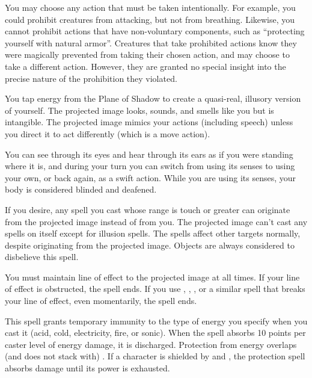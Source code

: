 You may choose any action that must be taken intentionally. For example, you could prohibit creatures from attacking, but not from breathing. Likewise, you cannot prohibit actions that have non-voluntary components, such as ``protecting yourself with natural armor''. 
\spellnotes Creatures that take prohibited actions know they were magically prevented from taking their chosen action, and may choose to take a different action. However, they are granted no special insight into the precise nature of the prohibition they violated.

\spellrng{\rngmed}
\spelldur{\durshort \dismissable}
\spelleffect You tap energy from the Plane of Shadow to create a quasi-real, illusory version of yourself. The projected image looks, sounds, and smells like you but is intangible. The projected image mimics your actions (including speech) unless you direct it to act differently (which is a move action).
\par You can see through its eyes and hear through its ears as if you were standing where it is, and during your turn you can switch from using its senses to using your own, or back again, as a swift action. While you are using its senses, your body is considered blinded and deafened.
\par If you desire, any spell you cast whose range is touch or greater can originate from the projected image instead of from you. The projected image can't cast any spells on itself except for illusion spells. The spells affect other targets normally, despite originating from the projected image.
\spellnotes Objects are always considered to disbelieve this spell.
\par You must maintain line of effect to the projected image at all times. If your line of effect is obstructed, the spell ends. If you use , , , or a similar spell that breaks your line of effect, even momentarily, the spell ends.

\spelleffect This spell grants temporary immunity to the type of energy you specify when you cast it (acid, cold, electricity, fire, or sonic). When the spell absorbs 10 points per caster level of energy damage, it is discharged.
\spellnotes Protection from energy overlaps (and does not stack with) . If a character is shielded by  and , the protection spell absorbs damage until its power is exhausted.

